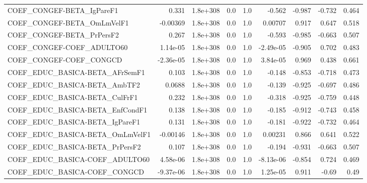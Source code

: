 \begin{tabular}{lrrrrrrrr}
COEF\_CONGEF-BETA\_IgPareF1             &       0.331 &     1.8e+308 &     0.0 &      1.0 &     -0.562 &      -0.987 &       -0.732 &         0.464 \\
COEF\_CONGEF-BETA\_OmLmVelF1            &    -0.00369 &     1.8e+308 &     0.0 &      1.0 &    0.00707 &       0.917 &        0.647 &         0.518 \\
COEF\_CONGEF-BETA\_PrPersF2             &       0.267 &     1.8e+308 &     0.0 &      1.0 &     -0.593 &      -0.985 &       -0.663 &         0.507 \\
COEF\_CONGEF-COEF\_ADULTO60             &    1.14e-05 &     1.8e+308 &     0.0 &      1.0 &  -2.49e-05 &      -0.905 &        0.702 &         0.483 \\
COEF\_CONGEF-COEF\_CONGCD               &   -2.36e-05 &     1.8e+308 &     0.0 &      1.0 &   3.84e-05 &       0.969 &        0.438 &         0.661 \\
COEF\_EDUC\_BASICA-BETA\_AFrSemF1        &       0.103 &     1.8e+308 &     0.0 &      1.0 &     -0.148 &      -0.853 &       -0.718 &         0.473 \\
COEF\_EDUC\_BASICA-BETA\_AmbTF2          &      0.0688 &     1.8e+308 &     0.0 &      1.0 &     -0.139 &      -0.925 &       -0.697 &         0.486 \\
COEF\_EDUC\_BASICA-BETA\_CulFrF1         &       0.232 &     1.8e+308 &     0.0 &      1.0 &     -0.318 &      -0.925 &       -0.759 &         0.448 \\
COEF\_EDUC\_BASICA-BETA\_EnfCondF1       &       0.138 &     1.8e+308 &     0.0 &      1.0 &     -0.185 &      -0.912 &       -0.743 &         0.458 \\
COEF\_EDUC\_BASICA-BETA\_IgPareF1        &       0.131 &     1.8e+308 &     0.0 &      1.0 &     -0.181 &      -0.922 &       -0.732 &         0.464 \\
COEF\_EDUC\_BASICA-BETA\_OmLmVelF1       &    -0.00146 &     1.8e+308 &     0.0 &      1.0 &    0.00231 &       0.866 &        0.641 &         0.522 \\
COEF\_EDUC\_BASICA-BETA\_PrPersF2        &       0.107 &     1.8e+308 &     0.0 &      1.0 &     -0.194 &      -0.931 &       -0.663 &         0.507 \\
COEF\_EDUC\_BASICA-COEF\_ADULTO60        &    4.58e-06 &     1.8e+308 &     0.0 &      1.0 &  -8.13e-06 &      -0.854 &        0.724 &         0.469 \\
COEF\_EDUC\_BASICA-COEF\_CONGCD          &   -9.37e-06 &     1.8e+308 &     0.0 &      1.0 &   1.25e-05 &       0.911 &        -0.69 &          0.49 \\

\end{tabular}
